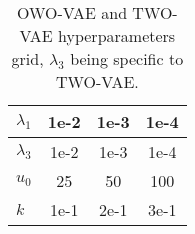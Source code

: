 \begin{table}[ht]
\centering
\caption{OWO-VAE and TWO-VAE hyperparameters grid, $\lambda_3$ being specific to TWO-VAE.}
\label{tab:vae_hp}
\begin{tabular}{l|c|c|c}
$\lambda_1$ & 1e-2 & 1e-3 & 1e-4 \\ \hline
$\lambda_3$ & 1e-2 & 1e-3 & 1e-4 \\ \hline
$u_0$ & 25 & 50 & 100 \\ \hline
$k$ & 1e-1 & 2e-1 & 3e-1
\end{tabular}
\end{table}